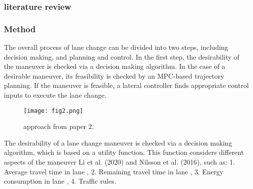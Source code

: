 \documentclass{article}
\begin{document}
  \subsubsection{literature review}
\subsubsection{Method}
The overall process of lane change can be divided into two steps,
including decision making, and planning and control. In the first step,
the desirability of the maneuver is checked via a decision making
algorithm. In the case of a desirable maneuver, its feasibility is checked
by an MPC-based trajectory planning. If the maneuver is feasible, a
lateral controller finds appropriate control inputs to execute the lane
change.
\begin{figure}
  \texttt{[image: fig2.png]}
  \caption{approach from paper 2.}
  \label{fig:Gui}
\end{figure}
The desirability of a lane change maneuver is checked via a decision
making algorithm, which is based on a utility function. This function
considers different aspects of the maneuver Li et al. (2020) and Nilsson
et al. (2016), such as:
1. Average travel time in lane ,
2. Remaining travel time in lane ,
3. Energy consumption in lane ,
4. Traffic rules.
\end{document}
